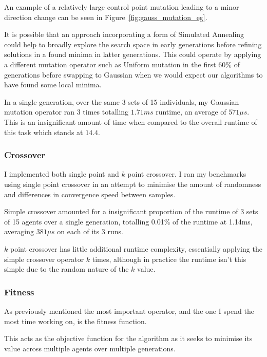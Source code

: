 An example of a relatively large control point mutation leading to a minor direction change can be seen in Figure~\ref{fig:gauss_mutation_eg}.

It is possible that an approach incorporating a form of Simulated Annealing could help to broadly explore the search space in early generations before refining solutions in a found minima in latter generations. This could operate by applying a different mutation operator such as Uniform mutation in the first 60\% of generations before swapping to Gaussian when we would expect our algorithms to have found some local minima.

In a single generation, over the same 3 sets of 15 individuals, my Gaussian mutation operator ran 3 times totalling $1.71 ms$ runtime, an average of $571\mu s$. This is an insignificant amount of time when compared to the overall runtime of this task which stands at $14.4$.

\subsubsection{Crossover}

I implemented both single point and $k$ point crossover. I ran my benchmarks using single point crossover in an attempt to minimise the amount of randomness and differences in convergence speed between samples.

Simple crossover amounted for a insignificant proportion of the runtime of 3 sets of 15 agents over a single generation, totalling 0.01\% of the runtime at 1.14ms, averaging $381\mu s$ on each of its 3 runs.

$k$ point crossover has little additional runtime complexity, essentially applying the simple crossover operator $k$ times, although in practice the runtime isn't this simple due to the random nature of the $k$ value.


\subsubsection{Fitness}

As previously mentioned the most important operator, and the one I spend the most time working on, is the fitness function.

This acts as the objective function for the algorithm as it seeks to minimise its value across multiple agents over multiple generations.

